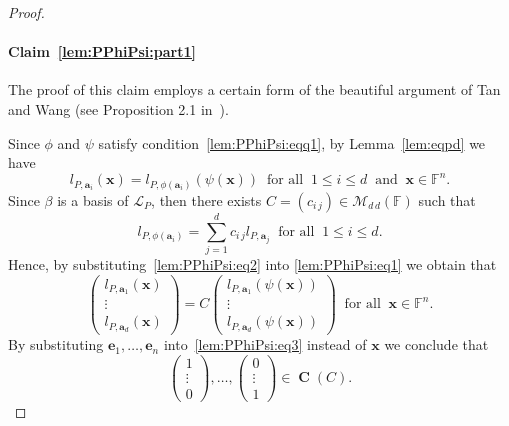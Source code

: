 \documentclass{elsarticle}
\DeclareMathOperator{\colsp}{\mathbf C}
\def\F{{\mathbb F}}
\def\L{{\mathcal L}}
\def\M{{\mathcal M}}
\theoremstyle{definition}
\numberwithin{equation}{section}
\begin{document}
\begin{proof}
\paragraph{Claim~\ref{lem:PPhiPsi:part1}}%
The proof of this claim employs a certain form of the beautiful argument of Tan and Wang (see Proposition 2.1 in~\cite{TAN2003311}).


Since $\phi$ and  $\psi$ satisfy condition~\eqref{lem:PPhiPsi:eqq1}, by Lemma~\ref{lem:eqpd} we have
\begin{equation}\label{lem:PPhiPsi:eq1}
l_{P,\mathbf a_i}(\mathbf x) = l_{P, \phi(\mathbf a_i)}(\psi(\mathbf x))\;\;\mbox{for all}\;\;1 \le i \le d\;\;\mbox{and}\;\;\mathbf x \in \F^n.
\end{equation}
 Since $\beta$ is a basis of $\L_P$, then there exists $C = (c_{i\,j}) \in \M_{d\,d}(\F)$ such that 
\begin{equation}\label{lem:PPhiPsi:eq2}
l_{P, \phi(\mathbf a_i)} = \sum_{j = 1}^{d} c_{i\,j} l_{P, \mathbf a_j}\;\;\mbox{for all}\;\; 1 \le i \le d.
\end{equation}
Hence, by substituting~\eqref{lem:PPhiPsi:eq2} into \eqref{lem:PPhiPsi:eq1} we obtain that
\begin{equation}\label{lem:PPhiPsi:eq3}
\begin{pmatrix}
l_{P,\mathbf a_1}(\mathbf x)\\
\vdots\\
l_{P,\mathbf a_d}(\mathbf x)
\end{pmatrix}
= C 
\begin{pmatrix}
l_{P,\mathbf a_1}(\psi(\mathbf x))\\
\vdots\\
l_{P,\mathbf a_d} (\psi(\mathbf x))
\end{pmatrix}
\;\;\mbox{for all}\;\;\mathbf x \in \F^n.
\end{equation}
By substituting $\mathbf e_{1}, \ldots, \mathbf e_{n}$ into~\eqref{lem:PPhiPsi:eq3} instead of $\mathbf x$ we conclude that 
\begin{equation*}
\begin{pmatrix}
1\\
\vdots\\
0
\end{pmatrix}, \ldots, 
\begin{pmatrix}
0\\
\vdots\\
1
\end{pmatrix} \in \colsp (C).
\end{equation*}

\end{proof}
\end{document}
